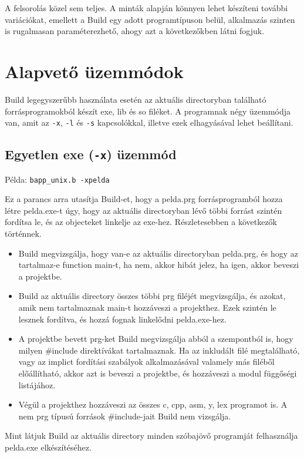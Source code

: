 A felsorolás közel sem teljes. A minták alapján könnyen lehet 
készíteni további variációkat, emellett a Build egy adott
programtípuson belül, alkalmazás szinten is rugalmasan paraméterezhető,
ahogy azt a következőkben látni fogjuk.


\section{Alapvető üzemmódok}


Build legegyszerűbb használata esetén az aktuális directoryban található 
forrásprogramokból készít exe, lib és so filéket. A programnak négy üzemmódja
van, amit az {\tt -x}, {\tt -l} és {\tt -s} kapcsolókkal, illetve
ezek elhagyásával lehet beállítani.

\subsection{Egyetlen exe ({\tt -x}) üzemmód\label{switchx}}

Példa: {\tt bapp\_unix.b -xpelda}

Ez a parancs arra utasítja Build-et, hogy a pelda.prg forrásprogramból
hozza létre pelda.exe-t úgy, hogy az aktuális directoryban lévő többi 
forrást szintén fordítsa le, és az objecteket linkelje az exe-hez.
Részletesebben a következők történnek.

\begin{itemize}  
\item 
  Build  megvizsgálja, hogy van-e az aktuális directoryban
  pelda.prg, és hogy az tartalmaz-e  function main-t, ha nem,
  akkor hibát jelez, ha igen, akkor beveszi a projektbe.
\item
  Build az aktuális directory összes többi prg filéjét megvizsgálja,
  és azokat, amik nem tartalmaznak main-t hozzáveszi a projekthez.
  Ezek szintén le lesznek fordítva, és hozzá fognak linkelődni 
  pelda.exe-hez.
\item
  A projektbe bevett prg-ket Build megvizsgálja abból a szempontból is, 
  hogy milyen \#include direktívákat tartalmaznak. Ha az inkludált filé 
  megtalálható, vagy az implict fordítási szabályok alkalmazásával valamely 
  más filéből előállítható, akkor azt is beveszi a projektbe, és
  hozzáveszi a modul függőségi listájához. 
\item
  Végül a projekthez hozzáveszi az összes c, cpp, asm, y, lex programot is.
  A nem prg típusú források \#include-jait Build nem vizsgálja.
\end{itemize} 
Mint látjuk Build az aktuális directory minden szóbajövő programját
felhasználja pelda.exe elkészítéséhez. 


